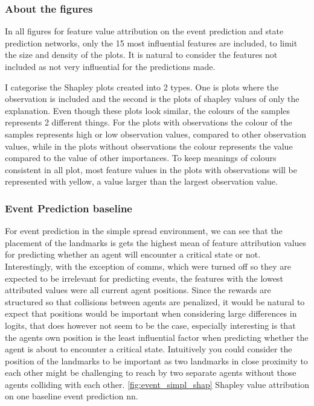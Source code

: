 \documentclass[UKenglish]{uiomasterthesis}
\begin{document}
\subsubsection{About the figures}
In all figures for feature value attribution on the event prediction and state prediction networks, only the 15 most influential features are included, to limit the size and density of the plots. It is natural to consider the features not included as not very influential for the predictions made.

I categorise the Shapley plots created into 2 types. One is plots where the observation is included and the second is the plots of shapley values of only the explanation. Even though these plots look similar, the colours of the samples represents 2 different things. For the plots with observations the colour of the samples represents high or low observation values, compared to other observation values, while in the plots without observations the colour represents the value compared to the value of other importances. To keep meanings of colours consistent in all plot, most feature values in the plots with observations will be represented with yellow, a value larger than the largest observation value.

\subsubsection{Event Prediction baseline}
For event prediction in the simple spread environment, we can see that the placement of the landmarks is gets the highest mean of feature attribution values for predicting whether an agent will encounter a critical state or not. Interestingly, with the exception of comms, which were turned off so they are expected to be irrelevant for predicting events, the features with the lowest attributed values were all current agent positions. Since the rewards are structured so that collisions between agents are penalized, it would be natural to expect that positions would be important when considering large differences in logits, that does however not seem to be the case, especially interesting is that the agents own position is the least influential factor when predicting whether the agent is about to encounter a critical state. Intuitively you could consider the position of the landmarks to be important as two landmarks in close proximity to each other might be challenging to reach by two separate agents without those agents colliding with each other. \cref{fig:event_simpl_shap} Shapley value attribution on one baseline event prediction \ac{nn}.
\end{document}
